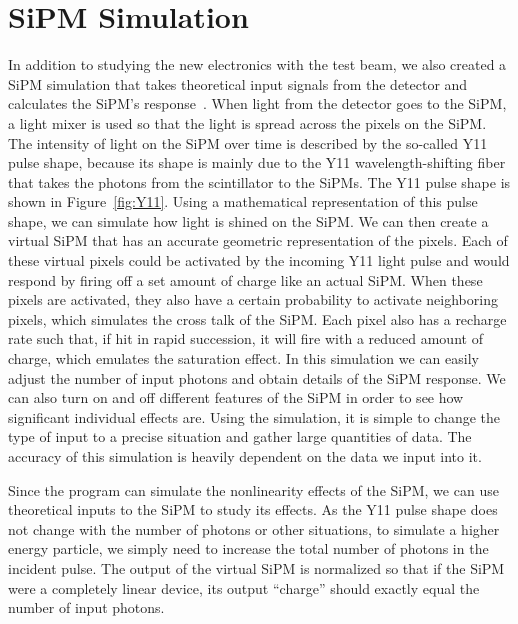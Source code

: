 \section{SiPM Simulation}

In addition to studying the new electronics with the test beam, we also created a SiPM simulation that takes theoretical input signals from the detector and calculates the SiPM's response~\cite{SiPMSimulation_github}. When light from the detector goes to the SiPM, a light mixer is used so that the light is spread across the pixels on the SiPM. The intensity of light on the SiPM over time is described by the so-called Y11 pulse shape, because its shape is mainly due to the Y11 wavelength-shifting fiber that takes the photons from the scintillator to the SiPMs. The Y11 pulse shape is shown in Figure~\ref{fig:Y11}. Using a mathematical representation of this pulse shape, we can simulate how light is shined on the SiPM. We can then create a virtual SiPM that has an accurate geometric representation of the pixels. Each of these virtual pixels could be activated by the incoming Y11 light pulse and would respond by firing off a set amount of charge like an actual SiPM. When these pixels are activated, they also have a certain probability to activate neighboring pixels, which simulates the cross talk of the SiPM. Each pixel also has a recharge rate such that, if hit in rapid succession, it will fire with a reduced amount of charge, which emulates the saturation effect. In this simulation we can easily adjust the number of input photons and obtain details of the SiPM response. We can also turn on and off different features of the SiPM in order to see how significant individual effects are. Using the simulation, it is simple to change the type of input to a precise situation and gather large quantities of data. The accuracy of this simulation is heavily dependent on the data we input into it.

Since the program can simulate the nonlinearity effects of the SiPM, we can use theoretical inputs to the SiPM to study its effects. As the Y11 pulse shape does not change with the number of photons or other situations, to simulate a higher energy particle, we simply need to increase the total number of photons in the incident pulse. The output of the virtual SiPM is normalized so that if the SiPM were a completely linear device, its output ``charge'' should exactly equal the number of input photons.

